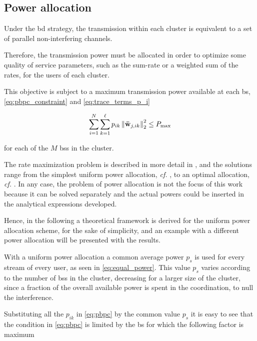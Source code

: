 \subsection{Power allocation}\label{ssec:achiev_rate_power}

Under the \gls{bd} strategy, the transmission within each cluster is equivalent
to a set of parallel non-interfering channels.

Therefore, the transmission power must be allocated in order to optimize some
quality of service parameters, such as the sum-rate or a weighted sum of the
rates, for the users of each cluster.

This objective is subject to a maximum transmission power available at each
\gls{bs}, \eqref{eq:pbpc_constraint} and \eqref{eq:trace_terms_p_i}

\begin{equation} \label{eq:pbpc}
	\sum\limits_{i = 1}^N \sum\limits_{k = 1}^\ell p_{ik} \left\| \mathbf{\bar{w}}_{j, ik}
    \right\|_2^2 \leq P_{\max}
\end{equation}

\noindent
for each of the $M$ \glspl{bs} in the cluster.

The rate maximization problem is described in more detail in
, and the solutions range from the simplest uniform
power allocation, \emph{cf.} , to an optimal
allocation, \emph{cf.} . In any case, the
problem of power allocation is not the focus of this work because it can be
solved separately and the actual powers could be inserted in the analytical
expressions developed.

Hence, in the following a theoretical framework is derived for the uniform power
allocation scheme, for the sake of simplicity, and an example with a different
power allocation will be presented with the results.

With a uniform power allocation a common average power $p_s$ is used for every
stream of every user, as seen in \eqref{eq:equal_power}. This value $p_s$ varies
according to the number of \glspl{bs} in the cluster, decreasing for a larger
size of the cluster, since a fraction of the overall available power is spent in
the coordination, to null the interference.

Substituting all the $p_{ik}$ in \eqref{eq:pbpc} by the common value $p_s$ it is
easy to see that the condition in \eqref{eq:pbpc} is limited by the \gls{bs} for
which the following factor is maximum

